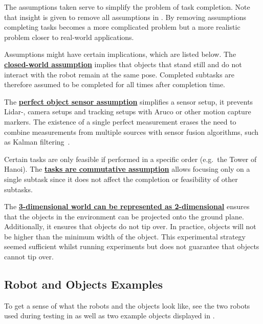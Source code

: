 The assumptions taken serve to simplify the problem of task completion. Note that insight is given to remove all assumptions in . By removing assumptions completing tasks becomes a more complicated problem but a more realistic problem closer to real-world applications.\bs

Assumptions might have certain implications, which are listed below. The \hyperref[assumption:closed_world]{\textbf{closed-world assumption}} implies that objects that stand still and do not interact with the robot remain at the same pose. Completed subtasks are therefore assumed to be completed for all times after completion time.\bs

The \hyperref[assumption:perfect_object_sensor]{\textbf{perfect object sensor assumption}} simplifies a sensor setup, it prevents Lidar-, camera setups and tracking setups with Aruco or other motion capture markers. The existence of a single perfect measurement erases the need to combine measurements from multiple sources with sensor fusion algorithms, such as Kalman filtering~\cite{verhaegen_filtering_2007}.\bs

Certain tasks are only feasible if performed in a specific order (e.g.~the Tower of Hanoi). The \hyperref[assumption:order_does_not_matter]{\textbf{tasks are commutative assumption}} allows focusing only on a single subtask since it does not affect the completion or feasibility of other subtasks.\bs

The \hyperref[assumption:no_tipping]{\textbf{3-dimensional world can be represented as 2-dimensional}} ensures that the objects in the environment can be projected onto the ground plane. Additionally, it ensures that objects do not tip over. In practice, objects will not be higher than the minimum width of the object. This experimental strategy seemed sufficient whilst running experiments but does not guarantee that objects cannot tip over.

\subsection{Robot and Objects Examples}
To get a sense of what the robots and the objects look like, see the two robots used during testing in  as well as two example objects displayed in .

